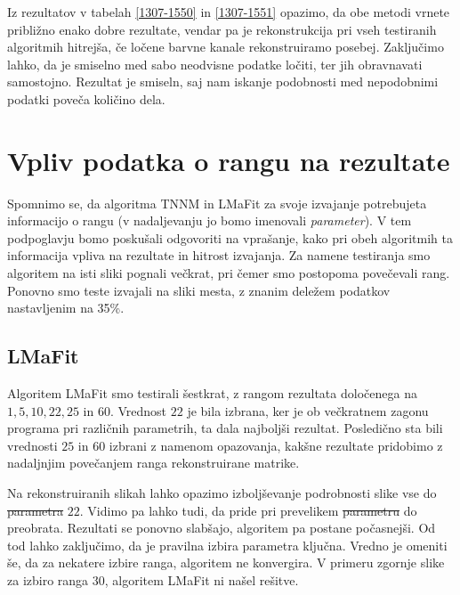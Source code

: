 Iz rezultatov v  tabelah \eqref{1307-1550} in \eqref{1307-1551} opazimo, da obe metodi vrnete približno enako dobre rezultate, vendar pa je rekonstrukcija pri vseh testiranih algoritmih hitrejša, če ločene barvne kanale rekonstruiramo posebej. Zaključimo lahko, da je smiselno med sabo neodvisne podatke ločiti, ter jih obravnavati samostojno. Rezultat je smiseln, saj nam iskanje podobnosti med nepodobnimi podatki poveča količino dela.


\section{Vpliv podatka o rangu na rezultate} \label{1307-2253}
Spomnimo se, da algoritma TNNM in LMaFit za svoje izvajanje potrebujeta informacijo o rangu (v nadaljevanju jo bomo imenovali \textit{parameter}). V tem podpoglavju bomo poskušali odgovoriti na vprašanje, kako pri obeh algoritmih ta informacija vpliva na rezultate in hitrost izvajanja. Za namene testiranja smo algoritem na isti sliki pognali večkrat, pri čemer smo postopoma povečevali rang. Ponovno smo teste izvajali na sliki mesta, z znanim deležem podatkov nastavljenim na 35\%.

\subsection{LMaFit}
Algoritem LMaFit smo testirali šestkrat, z rangom rezultata določenega na
$1, 5, 10, 22, 25$ in $60$. Vrednost $22$ je bila izbrana, ker je ob večkratnem zagonu programa pri različnih parametrih, ta dala najboljši rezultat. Posledično sta bili vrednosti $25$ in $60$ izbrani z namenom opazovanja, kakšne rezultate pridobimo z nadaljnjim povečanjem ranga rekonstruirane matrike.



Na rekonstruiranih slikah lahko opazimo izboljševanje podrobnosti slike vse do \st{parametra} $22$. Vidimo pa lahko tudi, da pride pri prevelikem \st{parametru} do preobrata. Rezultati se ponovno slabšajo, algoritem pa postane počasnejši. Od tod lahko zaključimo, da je pravilna izbira parametra ključna. Vredno je omeniti še, da za nekatere izbire ranga, algoritem ne konvergira. V primeru zgornje slike za izbiro ranga $30$, algoritem LMaFit ni našel rešitve.

